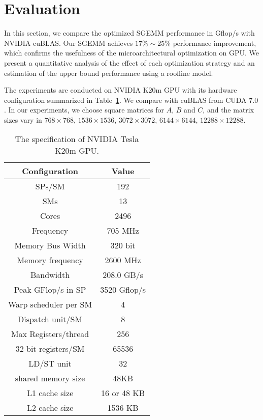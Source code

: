 \section{Evaluation}
\label{sec:experiment}


In this section, we compare the optimized SGEMM performance in Gflop/s with NVIDIA cuBLAS. 
Our SGEMM achieves $17\%\sim 25\%$ performance
improvement, which confirms the usefulness of the microarchitectural optimization on GPU. 
We present 
a quantitative analysis of the effect of each optimization strategy and an estimation of the upper bound performance using a roofline model.

The experiments are conducted on NVIDIA K20m GPU with its hardware configuration summarized in 
Table~\ref{table:k20}. We compare with cuBLAS from CUDA $7.0$. In our experiments, we choose square matrices for $A$, $B$
and $C$, and  the matrix sizes vary in $768\times768$, $1536\times1536$, $3072\times3072$, $6144\times6144$, $12288\times12288$.

\begin{table}[htbp]
\caption{The specification of NVIDIA Tesla K20m GPU.}
\centering
\scalebox{0.8} {
\begin{tabular}{|c|c|}
\hline
Configuration& Value\\
\hline
SPs/SM &192\\
\hline
SMs&13\\
\hline
Cores &2496\\
\hline
Frequency&705 MHz\\
\hline
Memory Bus Width&320 bit \\
\hline
Memory frequency&2600 MHz\\
\hline
Bandwidth&208.0 GB/s\\
\hline
Peak GFlop/s in SP&3520 Gflop/s\\
\hline
Warp scheduler per SM&4\\
\hline
Dispatch unit/SM&8\\
\hline
Max Registers/thread&256 \\
\hline
    32-bit registers/SM&65536 \\ %
\hline
LD/ST unit&32 \\
\hline
shared memory size&48KB\\
\hline
L1 cache size&16 or 48 KB\\
\hline
L2 cache size&1536 KB\\
\hline
\end{tabular}
}
\label{table:k20}
\end{table}


